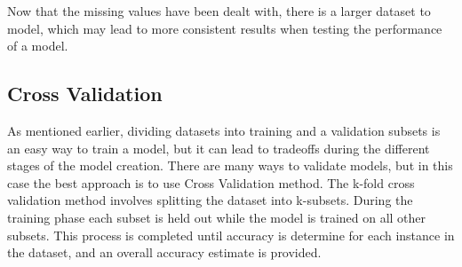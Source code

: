 \documentclass[a4paper,12pt]{article}\usepackage[]{graphicx}\usepackage[]{color}
\begin{document}
Now that the missing values have been dealt with, there is a larger dataset to model, which may lead to more consistent results when testing the performance of a model.

\clearpage

\subsection{Cross Validation}\label{cross_validation}
As mentioned earlier, dividing datasets into training and a validation subsets is an easy way to train a model, but it can lead to tradeoffs during the different stages of the model creation. There are many ways to validate models, but in this case the best approach is to use Cross Validation method. The k-fold cross validation method involves splitting the dataset into k-subsets. During the training phase each subset is held out while the model is trained on all other subsets. This process is completed until accuracy is determine for each instance in the dataset, and an overall accuracy estimate is provided.
\end{document}

